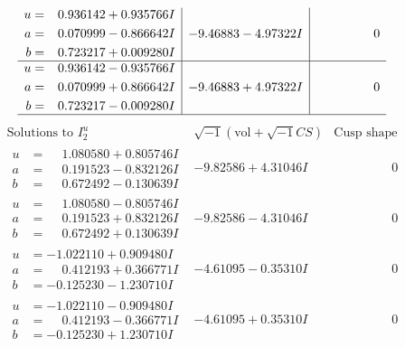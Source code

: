 \documentclass[1p]{elsarticle_modified}
\theoremstyle{definition}
\newcommand{\I}{\sqrt{-1}}
\begin{document}
$$\begin{array}{c|c|c}
\begin{aligned}
u &= \phantom{-}0.936142 + 0.935766 I \\
a &= \phantom{-}0.070999 - 0.866642 I \\
b &= \phantom{-}0.723217 + 0.009280 I\end{aligned}
 & -9.46883 - 4.97322 I & \phantom{-0.000000 } 0 \\ \hline\begin{aligned}
u &= \phantom{-}0.936142 - 0.935766 I \\
a &= \phantom{-}0.070999 + 0.866642 I \\
b &= \phantom{-}0.723217 - 0.009280 I\end{aligned}
 & -9.46883 + 4.97322 I & \phantom{-0.000000 } 0\\
 \hline 
 \end{array}$$\newpage$$\begin{array}{c|c|c}  
\text{Solutions to }I^u_{2}& \I (\text{vol} + \sqrt{-1}CS) & \text{Cusp shape}\\
 \hline 
\begin{aligned}
u &= \phantom{-}1.080580 + 0.805746 I \\
a &= \phantom{-}0.191523 - 0.832126 I \\
b &= \phantom{-}0.672492 - 0.130639 I\end{aligned}
 & -9.82586 + 4.31046 I & \phantom{-0.000000 } 0 \\ \hline\begin{aligned}
u &= \phantom{-}1.080580 - 0.805746 I \\
a &= \phantom{-}0.191523 + 0.832126 I \\
b &= \phantom{-}0.672492 + 0.130639 I\end{aligned}
 & -9.82586 - 4.31046 I & \phantom{-0.000000 } 0 \\ \hline\begin{aligned}
u &= -1.022110 + 0.909480 I \\
a &= \phantom{-}0.412193 + 0.366771 I \\
b &= -0.125230 - 1.230710 I\end{aligned}
 & -4.61095 - 0.35310 I & \phantom{-0.000000 } 0 \\ \hline\begin{aligned}
u &= -1.022110 - 0.909480 I \\
a &= \phantom{-}0.412193 - 0.366771 I \\
b &= -0.125230 + 1.230710 I\end{aligned}
 & -4.61095 + 0.35310 I & \phantom{-0.000000 } 0 \\ \hline\begin{aligned}

\end{aligned}
\end{array}$$
\end{document}
